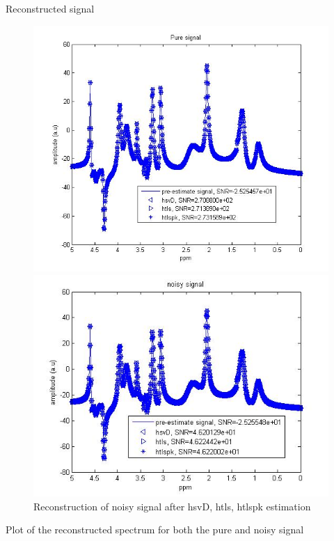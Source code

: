 \documentclass[t,12pt,english
\ifx\beamermode\undefined\else,\beamermode\fi
]{beamer}
\begin{document}
\begin{frame}{Reconstructed signal}

\begin{figure}[!htbp]
%
\centering
\includegraphics[width=1\textwidth]{22.jpg}
\caption{\tiny Reconstruction of noise free signal after hsvD, htls, htlspk estimation}\label{today1}
\endminipage\hfill
{}%
\centering
\includegraphics[width=1\textwidth]{23.jpg}
\caption{\tiny Reconstruction of noisy signal after hsvD, htls, htlspk estimation}\label{today2}
\endminipage\hfill
\end{figure}
\tiny{Plot of the reconstructed spectrum for both the  pure and noisy signal}
    
\end{frame}
\end{document}
